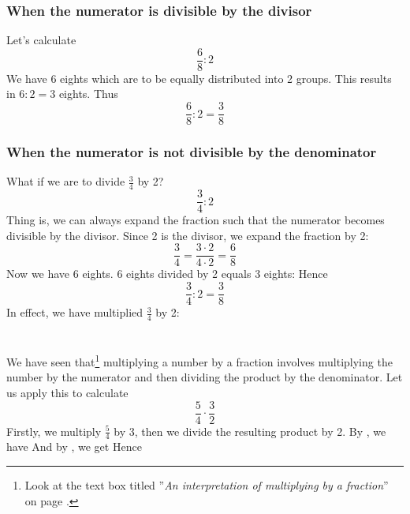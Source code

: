 \subsubsection{When the numerator is divisible by the divisor}
Let's calculate
\[ \frac{6}{8}:2 \]
We have 6 eights which are to be equally distributed into 2 groups. This results in $ 6:2=3 $ eights.
Thus
\[ \frac{6}{8}:2=\frac{3}{8} \]
\newpage
\subsubsection{When the numerator is not divisible by the denominator}
What if we are to divide $ \frac{3}{4} $ by 2? 
\[ \frac{3}{4}:2 \]
Thing is, we can always expand the fraction such that the numerator becomes divisible by the divisor. Since 2 is the divisor, we expand the fraction by 2:
\[ \frac{3}{4}=\frac{3\cdot2}{4\cdot2}=\frac{6}{8} \]
Now we have 6 eights. 6 eights divided by 2 equals 3 eights:
Hence
\[ \frac{3}{4}:2=\frac{3}{8} \]
In effect, we have multiplied $ \frac{3}{4} $ by 2:
\section{\brgngbr \label{brgngbr}}		
We have seen that\footnote{Look at the text box titled ''\textit{An interpretation of multiplying by a fraction}'' on page \pageref{brtolk}.} multiplying a number by a fraction involves multiplying the number by the numerator and then dividing the product by the denominator. Let us apply this to calculate
\[  {\frac{5}{4}\cdot\frac{3}{2}}\] 
Firstly, we multiply $ \frac{5}{4} $ by 3, then we divide the resulting product by 2. By , we have
And by , we get
Hence
\reg[\brtbr\label{brtbr}]{
When multiplying a fraction by a fraction, we multiply numerator by numerator and denominator by denominator.
}
\newpage
